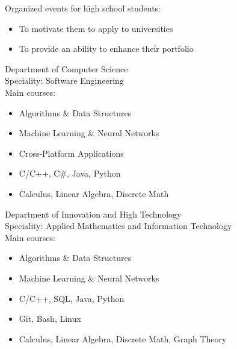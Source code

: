 \documentclass[10pt,a4paper,ragged2e]{altacv}
\begin{document}
\bigskip

Organized events for high school students:
\smallskip
\begin{itemize}
    \item To motivate them to apply to universities
    \item To provide an ability to enhance their portfolio
\end{itemize}


Department of Computer Science\\
\smallskip
Speciality: Software Engineering\\
\smallskip
Main courses:
\smallskip
\begin{itemize}
    \item Algorithms \& Data Structures
    \item Machine Learning \& Neural Networks
    \item Cross-Platform Applications
    \item C/C++, C\#, Java, Python
    \item Calculus, Linear Algebra, Discrete Math
\end{itemize}

\bigskip

Department of Innovation and High Technology\\
\smallskip
Speciality: Applied Mathematics and Information Technology\\
\smallskip
Main courses:
\smallskip
\begin{itemize}
    \item Algorithms \& Data Structures
    \item Machine Learning \& Neural Networks
    \item C/C++, SQL, Java, Python
    \item Git, Bash, Linux
    \item Calculus, Linear Algebra, Discrete Math, Graph Theory
\end{itemize}
\end{document}
